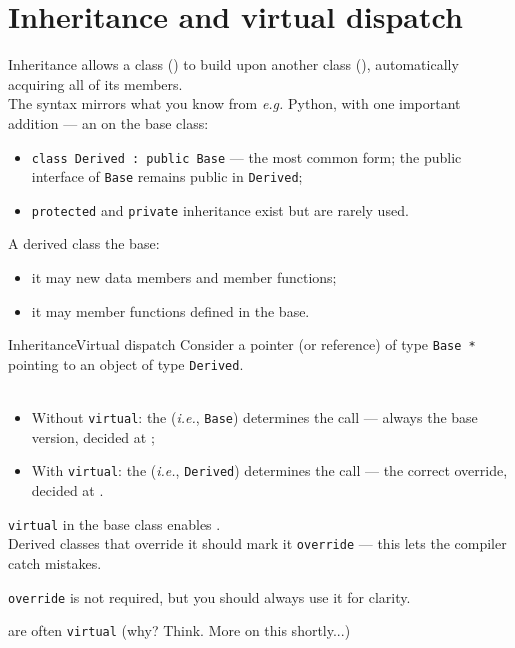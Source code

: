 
\section{Inheritance and virtual dispatch}
\graphicspath{{figs/section4/}}

\begin{frame}{Inheritance}
	\justifying
	 allows a class () to build upon another class (), automatically acquiring all of its members.\\
	\bigskip
	The syntax mirrors what you know from \emph{e.g.} Python, with one important addition — an  on the base class:
	\begin{itemize}
		\item \texttt{class Derived~:~public Base} — the most common form; the public interface of \texttt{Base} remains public in \texttt{Derived};
		\item \texttt{protected} and \texttt{private} inheritance exist but are rarely used.
	\end{itemize}
	\bigskip
	A derived class  the base:
	\begin{itemize}
		\item it may  new data members and member functions;
		\item it may  member functions defined in the base.
	\end{itemize}
\end{frame}
\begin{frame}{Inheritance}{Virtual dispatch}
	\justifying
	Consider a pointer (or reference) of type \texttt{Base *} pointing to an object of type \texttt{Derived}.\\
	\\
	\bigskip
	\begin{itemize}
		\item Without \texttt{virtual}: the  (\emph{i.e.}, \texttt{Base}) determines the call — always the base version, decided at ;
		\item With \texttt{virtual}: the  (\emph{i.e.}, \texttt{Derived}) determines the call — the correct override, decided at .
	\end{itemize}
	\bigskip
	 \texttt{virtual} in the base class enables .\\
	Derived classes that override it should mark it \texttt{override} — this lets the compiler catch mistakes.
	\begin{block}{}
		\centering
		\texttt{override} is not required, but you should always use it for clarity.
	\end{block}
   are often \texttt{virtual} (why? Think. More on this shortly...)
\end{frame}
